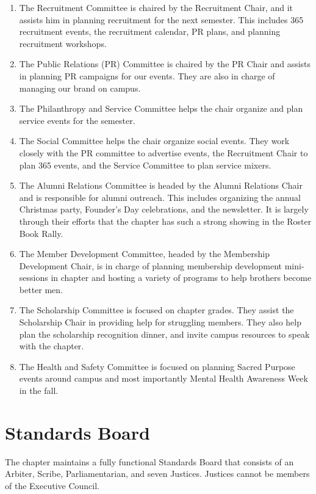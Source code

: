 	\begin{enumerate}
	  \item The Recruitment Committee is chaired by the Recruitment Chair, and it assists him in planning recruitment for the next semester. This includes 365 recruitment events, the recruitment calendar, PR plans, and planning recruitment workshops.
		
	  \item The Public Relations (PR) Committee is chaired by the PR Chair and assists in planning PR campaigns for our events. They are also in charge of managing our brand on campus. 
		
	  \item The Philanthropy and Service Committee helps the chair organize and plan service events for the semester.
		
	  \item The Social Committee helps the chair organize social events. They work closely with the PR committee to advertise events, the Recruitment Chair to plan 365 events, and the Service Committee to plan service mixers. 
		
	  \item The Alumni Relations Committee is headed by the Alumni Relations Chair and is responsible for alumni outreach. This includes organizing the annual Christmas party, Founder’s Day celebrations, and the newsletter. It is largely through their efforts that the chapter has such a strong showing in the Roster Book Rally.
		
	  \item The Member Development Committee, headed by the Membership Development Chair, is in charge of planning membership development mini-sessions in chapter and hosting a variety of programs to help brothers become better men.
		
	  \item The Scholarship Committee is focused on chapter grades. They assist the Scholarship Chair in providing help for struggling members. They also help plan the scholarship recognition dinner, and invite campus resources to speak with the chapter.
	  
	  \item The Health and Safety Committee is focused on planning Sacred Purpose events around campus and most importantly Mental Health Awareness Week in the fall.
	\end{enumerate}
    
    \section*{Standards Board}
      The chapter maintains a fully functional Standards Board that consists of an Arbiter, Scribe, Parliamentarian, and seven Justices. Justices cannot be members of the Executive Council. \\

